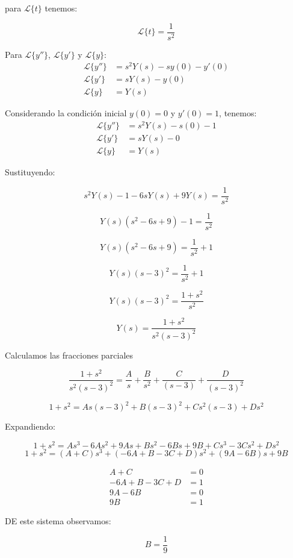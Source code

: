 \documentclass{article}
\begin{document}
para \(\mathcal{L}\{t\}\) tenemos:

\[\mathcal{L}\{t\}=\frac{1}{s^2}\]

Para \(\mathcal{L}\{y''\}\), \(\mathcal{L}\{y'\}\) y \(\mathcal{L}\{y\}\):
\begin{align*}
    \mathcal{L}\{y''\} & = s^2Y(s) - sy(0) - y'(0) \\
    \mathcal{L}\{y'\}  & = sY(s) - y(0)            \\
    \mathcal{L}\{y\}   & = Y(s)
\end{align*}

Considerando la condición inicial $y(0) = 0$ y $y'(0) = 1$, tenemos:
\begin{align*}
    \mathcal{L}\{y''\} & = s^2Y(s) - s(0) - 1 \\
    \mathcal{L}\{y'\}  & = sY(s) - 0          \\
    \mathcal{L}\{y\}   & = Y(s)
\end{align*}

Sustituyendo:

\[
    s^2Y(s) - 1 - 6sY(s) + 9Y(s) = \frac{1}{s^2}
\]

\[
    Y(s)(s^2 -6s + 9) - 1 = \frac{1}{s^2}
\]

\[
    Y(s)(s^2 -6s + 9) = \frac{1}{s^2} + 1
\]

\[
    Y(s)(s-3)^2 = \frac{1}{s^2} + 1
\]

\[
    Y(s)(s-3)^2 = \frac{1+s^2}{s^2}
\]

\[
    Y(s) = \frac{1+s^2}{s^2(s-3)^2}
\]

Calculamos las fracciones parciales

\[\frac{1+s^2}{s^2(s-3)^2} = \frac{A}{s} + \frac{B}{s^2} + \frac{C}{(s-3)} + \frac{D}{(s-3)^2}\]

\[1+s^2 = As(s-3)^2 + B(s-3)^2 + Cs^2(s-3) + Ds^2\]

Expandiendo:

\[1+s^2 = As^3-6As^2+9As+Bs^2-6Bs+9B+Cs^3-3Cs^2+Ds^2\]
\[1+s^2 = (A+C)s^3+(-6A+B-3C+D)s^2 + (9A-6B)s +9B\]

\begin{align*}
    A+C        & = 0 \\
    -6A+B-3C+D & = 1 \\
    9A-6B      & = 0 \\
    9B         & =1
\end{align*}

DE este sistema observamos:

\[B=\frac{1}{9}\]
\end{document}
